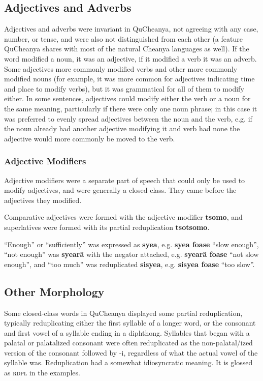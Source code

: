 \documentclass{article}
\begin{document}
\subsection{Adjectives and Adverbs}

Adjectives and adverbs were invariant in QuCheanya, not agreeing with any case, number, or tense, and were also not distinguished from each other (a feature QuCheanya shares with most of the natural Cheanya languages as well).  If the word modified a noun, it was an adjective, if it modified a verb it was an adverb.  Some adjectives more commonly modified verbs and other more commonly modified nouns (for example, it was more common for adjectives indicating time and place to modify verbs), but it was grammatical for all of them to modify either.  In some sentences, adjectives could modify either the verb or a noun for the same meaning, particularly if there were only one noun phrase; in this case it was preferred to evenly spread adjectives between the noun and the verb, e.g. if the noun already had another adjective modifying it and verb had none the adjective would more commonly be moved to the verb.

\subsubsection{Adjective Modifiers}

Adjective modifiers were a separate part of speech that could only be used to modify adjectives, and were generally a closed class.  They came before the adjectives they modified.

Comparative adjectives were formed with the adjective modifier \textbf{tsomo}, and superlatives were formed with its partial reduplication \textbf{tsotsomo}.

``Enough'' or ``sufficiently'' was expressed as \textbf{syea}, e.g. \textbf{syea foase} ``slow enough'', ``not enough'' was \textbf{syear\"a} with the negator attached, e.g. \textbf{syear\"a foase} ``not slow enough'', and ``too much'' was reduplicated \textbf{sisyea}, e.g. \textbf{sisyea foase} ``too slow''.

\subsection{Other Morphology}

Some closed-class words in QuCheanya displayed some partial reduplication, typically reduplicating either the first syllable of a longer word, or the consonant and first vowel of a syllable ending in a diphthong.  Syllables that began with a palatal or palatalized consonant were often reduplicated as the non-palatal/ized version of the consonant followed by -i, regardless of what the actual vowel of the syllable was.  Reduplication had a somewhat idiosyncratic meaning.  It is glossed as \textsc{rdpl} in the examples.
\end{document}
